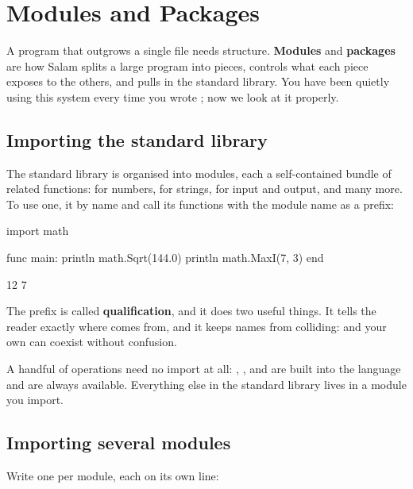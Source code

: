 \chapter{Modules and Packages}%
\label{ch:modules-packages}

A program that outgrows a single file needs structure. \textbf{Modules} and
\textbf{packages} are how Salam splits a large program into pieces, controls what
each piece exposes to the others, and pulls in the standard library. You have been
quietly using this system every time you wrote ; now we look at
it properly.

\section{Importing the standard library}

The standard library is organised into modules, each a self-contained bundle of
related functions:  for numbers,  for strings,  for
input and output, and many more. To use one,  it by name and call its
functions with the module name as a prefix:

\begin{salamen}
import math

func main:
    println math.Sqrt(144.0)
    println math.MaxI(7, 3)
end
\end{salamen}

\begin{progout}
12
7
\end{progout}

The prefix  is called \textbf{qualification}, and it does two
useful things. It tells the reader exactly where  comes from, and it
keeps names from colliding:  and your own  can coexist
without confusion.

\begin{note}
A handful of operations need no import at all: , , and
 are built into the language and are always available. Everything else
in the standard library lives in a module you import.
\end{note}

\section{Importing several modules}

Write one  per module, each on its own line:

